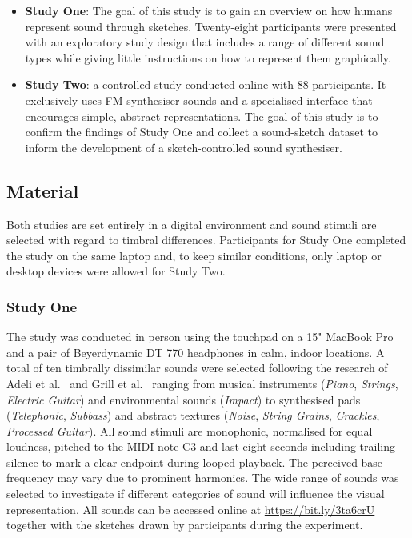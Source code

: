 \documentclass[]{interact}
\theoremstyle{plain}%
\theoremstyle{definition}
\theoremstyle{remark}
\begin{document}
\begin{itemize}
    \item \textbf{Study One}: The goal of this study is to gain an overview on how humans represent sound through sketches. Twenty-eight participants were presented with an exploratory study design that includes a range of different sound types while giving little instructions on how to represent them graphically. 
    \item \textbf{Study Two}: a controlled study conducted online with 88 participants. It exclusively uses FM synthesiser sounds and a specialised interface that encourages simple, abstract representations. The goal of this study is to confirm the findings of Study One and collect a sound-sketch dataset to inform the development of a sketch-controlled sound synthesiser.   
\end{itemize}

\subsection{Material}\label{subsec:material}
Both studies are set entirely in a digital environment and sound stimuli are selected with regard to timbral differences. Participants for Study One completed the study on the same laptop and, to keep similar conditions, only laptop or desktop devices were allowed for Study Two.

\subsubsection{Study One}\label{subsubsec:material_one}
The study was conducted in person using the touchpad on a 15" MacBook Pro and a pair of Beyerdynamic DT 770 headphones in calm, indoor locations. A total of ten timbrally dissimilar sounds were selected following the research of Adeli et al.~\cite{adeliAudiovisualCorrespondenceMusical2014} and Grill et al.~\cite{grillVisualizationPerceptualQualities2012} ranging from musical instruments (\textit{Piano}, \textit{Strings}, \textit{Electric Guitar}) and environmental sounds (\textit{Impact}) to synthesised pads (\textit{Telephonic}, \textit{Subbass}) and abstract textures (\textit{Noise}, \textit{String Grains}, \textit{Crackles}, \textit{Processed Guitar}). All sound stimuli are monophonic, normalised for equal loudness, pitched to the MIDI note C3 and last eight seconds including trailing silence to mark a clear endpoint during looped playback. The perceived base frequency may vary due to prominent harmonics. The wide range of sounds was selected to investigate if different categories of sound will influence the visual representation. All sounds can be accessed online at \url{https://bit.ly/3ta6crU} together with the sketches drawn by participants during the experiment.
\end{document}
